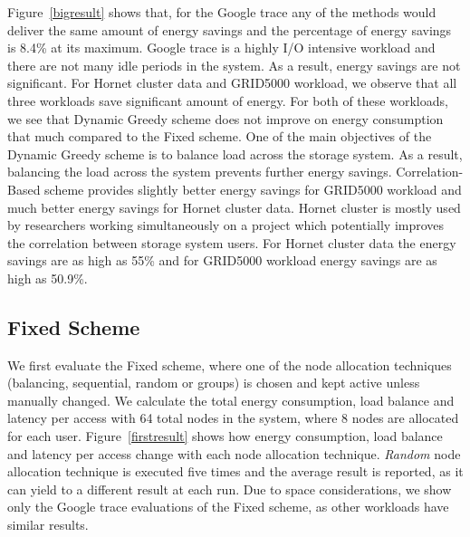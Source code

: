 Figure~\ref{bigresult} shows that, for the Google trace any of the methods would deliver the same amount
of energy savings and the percentage of energy savings is 8.4\% at its maximum. Google trace is a highly
I/O intensive workload and there are not many idle periods in the system. As a result, energy savings are
not significant. For Hornet cluster data and GRID5000 workload, we observe that all three workloads save
significant amount of energy. For both of these workloads, we see that Dynamic Greedy scheme does not
improve on energy consumption that much compared to the Fixed scheme. One of the main objectives of the
Dynamic Greedy scheme is to balance load across the storage system. As a result, balancing the load
across the system prevents further energy savings. Correlation-Based scheme provides slightly better energy
savings for GRID5000 workload and much better energy savings for Hornet cluster data. Hornet cluster is mostly
used by researchers working simultaneously on a project which potentially improves the correlation
between storage system users. For Hornet cluster data the energy savings are as high as 55\% and
for GRID5000 workload energy savings are as high as 50.9\%.

\subsection{Fixed Scheme}
We first evaluate the Fixed scheme, where one of the node allocation techniques (balancing, sequential,
random or groups) is chosen and kept active unless manually changed. We calculate the total
energy consumption, load balance and latency per access with 64 total nodes in the system,
where 8 nodes are allocated for each user. Figure~\ref{firstresult} shows how energy consumption, load balance
and latency per access change with each node allocation technique. \textit{Random} node allocation technique is
executed five times and the average result is reported, as it can yield to a different result
at each run. Due to space considerations, we show only the Google trace evaluations of the Fixed scheme,
as other workloads have similar results. 
 
